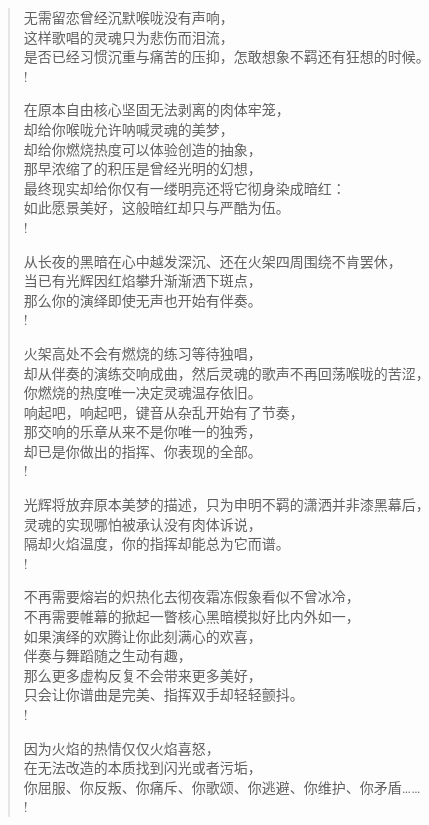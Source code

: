 \documentclass[UTF8, 12pt, a4paper]{ctexrep} %
\begin{document}
\begin{verse}
无需留恋曾经沉默喉咙没有声响，\\
这样歌唱的灵魂只为悲伤而泪流，\\
是否已经习惯沉重与痛苦的压抑，怎敢想象不羁还有狂想的时候。\\!

在原本自由核心坚固无法剥离的肉体牢笼，\\
却给你喉咙允许呐喊灵魂的美梦，\\
却给你燃烧热度可以体验创造的抽象，\\
那早浓缩了的积压是曾经光明的幻想，\\
最终现实却给你仅有一缕明亮还将它彻身染成暗红：\\
如此愿景美好，这般暗红却只与严酷为伍。\\!

从长夜的黑暗在心中越发深沉、还在火架四周围绕不肯罢休，\\
当已有光辉因红焰攀升渐渐洒下斑点，\\
那么你的演绎即使无声也开始有伴奏。\\!

火架高处不会有燃烧的练习等待独唱，\\
却从伴奏的演练交响成曲，然后灵魂的歌声不再回荡喉咙的苦涩，\\
你燃烧的热度唯一决定灵魂温存依旧。\\
响起吧，响起吧，键音从杂乱开始有了节奏，\\
那交响的乐章从来不是你唯一的独秀，\\
却已是你做出的指挥、你表现的全部。\\!

光辉将放弃原本美梦的描述，只为申明不羁的潇洒并非漆黑幕后，\\
灵魂的实现哪怕被承认没有肉体诉说，\\
隔却火焰温度，你的指挥却能总为它而谱。\\!

不再需要熔岩的炽热化去彻夜霜冻假象看似不曾冰冷，\\
不再需要帷幕的掀起一瞥核心黑暗模拟好比内外如一，\\
如果演绎的欢腾让你此刻满心的欢喜，\\
伴奏与舞蹈随之生动有趣，\\
那么更多虚构反复不会带来更多美好，\\
只会让你谱曲是完美、指挥双手却轻轻颤抖。\\!

因为火焰的热情仅仅火焰喜怒，\\
在无法改造的本质找到闪光或者污垢，\\
你屈服、你反叛、你痛斥、你歌颂、你逃避、你维护、你矛盾……\\!


\end{verse}
\end{document}
